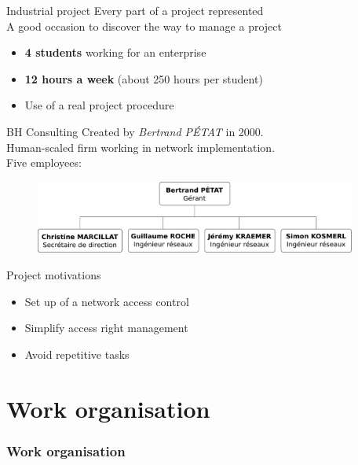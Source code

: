 \documentclass[12pt]{beamer}
\begin{document}
\begin{frame}{Industrial project}
    Every part of a project represented\\
    \vfill
    A good occasion to discover the way to manage a project
    \vfill
    \begin{itemize}
	\item \textbf{4 students} working for an enterprise
	\item \textbf{12 hours a week} (about 250 hours per student)
	\item Use of a real project procedure
    \end{itemize}
\end{frame}


    
\begin{frame}{BH Consulting}
    Created by \emph{Bertrand PÉTAT} in 2000.\\
    \vfill
    Human-scaled firm working in network implementation.\\
    \vfill
    Five employees:
    \begin{figure}
	\includegraphics[width=300pt]{img/organigramme.pdf}
    \end{figure}
\end{frame}


\begin{frame}{Project motivations}
    \begin{itemize}
	\item<1->Set up of a network access control 
	\vfill
	\item<2->Simplify access right management
	\vfill
	\item<3->Avoid repetitive tasks
    \end{itemize}

\end{frame}
    
\part{Work organisation}
\frame{\partpage}
\section{Work organisation}
\end{document}
